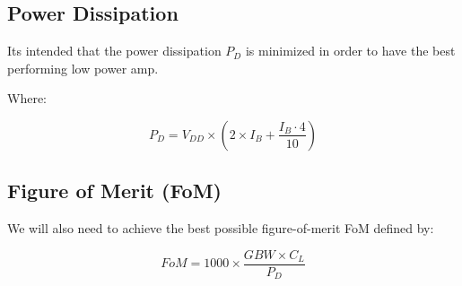 \subsection{Power Dissipation}

Its intended that the power dissipation $P_D$ is minimized in order to have the best performing low power amp.

Where: 

$$P_D = V_{DD} \times \left(2 \times I_B + \dfrac{I_B\cdot 4}{10}\right) $$

\subsection{Figure of Merit (FoM)}
 We will also need to achieve the best possible figure-of-merit FoM defined by: 

$$FoM = 1000 \times \dfrac{GBW \times C_L}{P_D}$$
